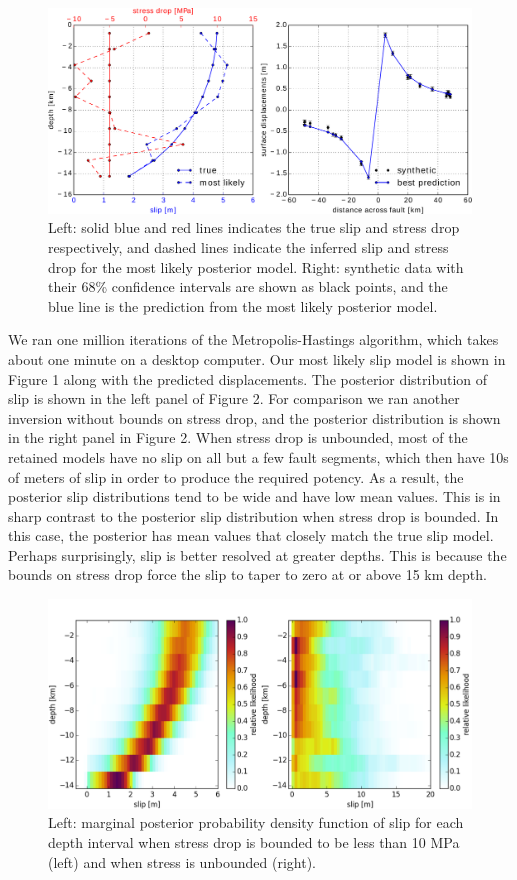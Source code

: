 \documentclass[12pt]{article}
\begin{document}
\begin{figure}
\includegraphics[width=1.0\textwidth]{figure_1}
\caption{Left: solid blue and red lines indicates the true slip and stress drop respectively, and dashed lines indicate the inferred slip and stress drop for the most likely posterior model.  Right: synthetic data with their 68\% confidence intervals are shown as black points, and the blue line is the prediction from the most likely posterior model.}  
\end{figure}

We ran one million iterations of the Metropolis-Hastings algorithm, which takes about one minute on a desktop computer.  Our most likely slip model is shown in Figure 1 along with the predicted displacements.  The posterior distribution of slip is shown in the left panel of Figure 2.  For comparison we ran another inversion without bounds on stress drop, and the posterior distribution is shown in the right panel in Figure 2.  When stress drop is unbounded, most of the retained models have no slip on all but a few fault segments, which then have 10s of meters of slip in order to produce the required potency.  As a result, the posterior slip distributions tend to be wide and have low mean values.  This is in sharp contrast to the posterior slip distribution when stress drop is bounded.  In this case, the posterior has mean values that closely match the true slip model. Perhaps surprisingly, slip is better resolved at greater depths. This is because the bounds on stress drop force the slip to taper to zero at or above 15 km depth.  


\begin{figure}
\includegraphics[width=1.0\textwidth]{figure_2}
\raggedleft
\caption{Left: marginal posterior probability density function of slip for each depth interval when stress drop is bounded to be less than 10 MPa (left) and when stress is unbounded (right).}  
\end{figure}

%


\end{document}
